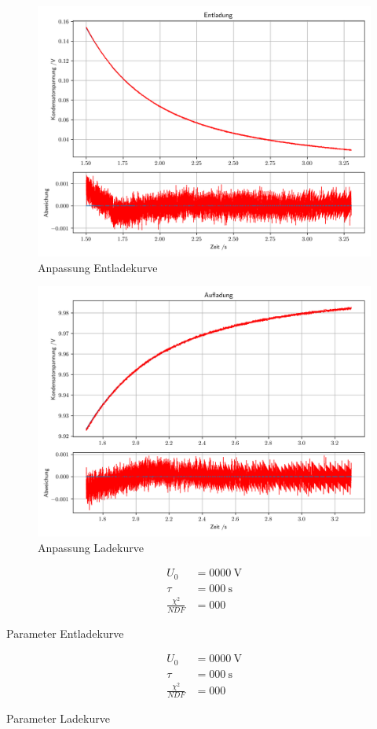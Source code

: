 \documentclass[12pt,twoside,a4paper]{scrartcl}
\begin{document}
				\begin{figure}[H]
					\centering
					\includegraphics[width = 0.8 \textwidth]{Plots/Capacitor/CapacitorEntladung.png}
					\caption{Anpassung Entladekurve}
				\end{figure}
				\begin{figure}[H]
					\centering
					\includegraphics[width = 0.8 \textwidth]{Plots/Capacitor/CapacitorAufladung.png}
					\caption{Anpassung Ladekurve}
				\end{figure}

				\begin{table}[H]
					\centering
					\begin{minipage}{0.4 \textwidth}
						\begin{align*}
							U_0 &= \SI{0000}{\volt} \\
							\tau &= \SI{000}{\second} \\
							\frac{\chi^2}{NDF} &= 000
						\end{align*}
						\caption{Parameter Entladekurve}
					\end{minipage}
					\begin{minipage}{0.4 \textwidth}
						 \begin{align*}
							 	U_0 &= \SI{0000}{\volt} \\
							 	\tau &= \SI{000}{\second}\\
								\frac{\chi^2}{NDF} &= 000
						 \end{align*}
						\caption{Parameter Ladekurve}
					\end{minipage}
				\end{table}
\end{document}
